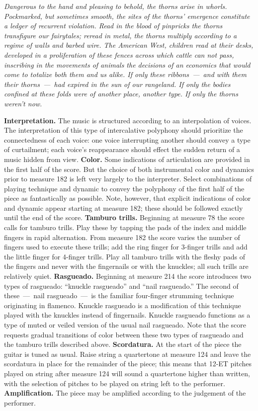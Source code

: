 \textit{Dangerous to the hand and pleasing to behold, the thorns arise in
whorls. Pockmarked, but sometimes smooth, the sites of the thorns' emergence
constitute a ledger of recurrent violation. Read in the blood of pinpricks the
thorns transfigure our fairytales; reread in metal, the thorns multiply
according to a regime of walls and barbed wire. The American West, children
read at their desks, developed in a proliferation of these fences across which
cattle can not pass, inscribing in the movements of animals the decisions of an
economics that would come to totalize both them and us alike. If only these
ribbons~---~and with them their thorns~---~had expired in the sun of our
rangeland. If only the bodies confined at these folds were of another place,
another type. If only the thorns weren't now.}

\textbf{Interpretation.} The music is structured according to an interpolation
of voices. The interpretation of this type of intercalative polyphony should
prioritize the connectedness of each voice: one voice interrupting another
should convey a type of curtailment; each voice's reappearance should effect
the sudden return of a music hidden from view. \textbf{Color.} Some indications
of articulation are provided in the first half of the score. But the choice of
both instrumental color and dynamics prior to measure 182 is left very largely
to the interpreter. Select combinations of playing technique and dynamic to
convey the polyphony of the first half of the piece as fantastically as
possible. Note, however, that explicit indications of color and dynamic appear
starting at measure 182; these should be followed exactly until the end of the
score. \textbf{Tamburo trills.} Beginning at measure 78 the score calls for
tamburo trills. Play these by tapping the pads of the index and middle fingers
in rapid alternation. From measure 182 the score varies the number of fingers
used to execute these trills; add the ring finger for 3-finger trills and add
the little finger for 4-finger trills. Play all tamburo trills with the fleshy
pads of the fingers and never with the fingernails or with the knuckles; all
such trills are relatively quiet. \textbf{Rasgueado.} Beginning at measure 214
the score introduces two types of rasgueado: ``knuckle rasgueado'' and ``nail
rasgueado.'' The second of these~---~nail rasgueado~---~is the familiar
four-finger strumming technique originating in flamenco. Knuckle rasgueado is a
modification of this technique played with the knuckles instead of fingernails.
Knuckle rasgueado functions as a type of muted or veiled version of the usual
nail rasgueado. Note that the score requests gradual transitions of color
between these two types of rasgueado and the tamburo trills described above.
\textbf{Scordatura.} At the start of the piece the guitar is tuned as usual.
Raise string  a quartertone at measure 124 and leave the scordatura
in place for the remainder of the piece; this means that 12-ET pitches played
on string  after measure 124 will sound a quartertone higher than
written, with the selection of pitches to be played on string  left
to the performer. \textbf{Amplification.} The piece may be amplified according
to the judgement of the performer.
